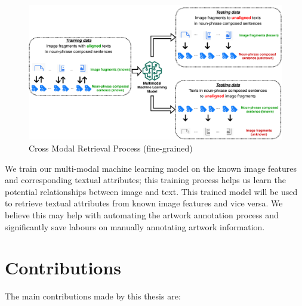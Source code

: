 \begin{figure}[h!]
\centering
\includegraphics[width=\textwidth]{framework.pdf}
\caption{Cross Modal Retrieval Process (fine-grained)}
\label{fig:framework}
\end{figure}

We train our multi-modal machine learning model on the known image features and corresponding textual attributes; this training process helps us learn the potential relationships between image and text. This trained model will be used to retrieve textual attributes from known image features and vice versa. We believe this may help with automating the artwork annotation process and significantly save labours on manually annotating artwork information.


\section{Contributions}
The main contributions made by this thesis are:

